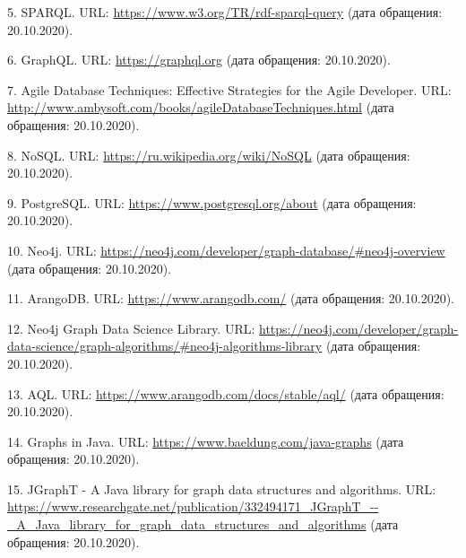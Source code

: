 5. SPARQL. URL: \url{https://www.w3.org/TR/rdf-sparql-query} (дата обращения: 20.10.2020).

6. GraphQL. URL: \url{https://graphql.org} (дата обращения: 20.10.2020).

7. Agile Database Techniques: Effective Strategies for the Agile Developer. URL: \url{http://www.ambysoft.com/books/agileDatabaseTechniques.html} (дата обращения: 20.10.2020).

8. NoSQL. URL: \url{https://ru.wikipedia.org/wiki/NoSQL} (дата обращения: 20.10.2020).

9. PostgreSQL. URL: \url{https://www.postgresql.org/about} (дата обращения: 20.10.2020).

10. Neo4j. URL: \url{https://neo4j.com/developer/graph-database/#neo4j-overview} (дата обращения: 20.10.2020).

11. ArangoDB. URL: \url{https://www.arangodb.com/} (дата обращения: 20.10.2020).

12. Neo4j Graph Data Science Library. URL: \url{https://neo4j.com/developer/graph-data-science/graph-algorithms/#neo4j-algorithms-library} (дата обращения: 20.10.2020).

13. AQL. URL: \url{https://www.arangodb.com/docs/stable/aql/} (дата обращения: 20.10.2020).

14. Graphs in Java. URL: \url{https://www.baeldung.com/java-graphs} (дата обращения: 20.10.2020).

15. JGraphT - A Java library for graph data structures and algorithms. URL: \url{https://www.researchgate.net/publication/332494171\_JGraphT\_--\_A\_Java\_library\_for\_graph\_data\_structures\_and\_algorithms} (дата обращения: 20.10.2020).
